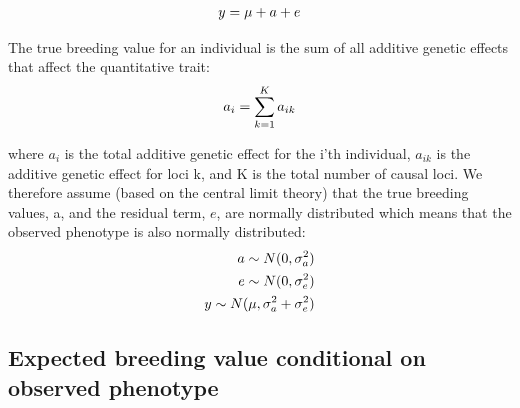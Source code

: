\documentclass[
]{article}
\begin{document}
\begin{align}
            y=\mu+a+e    \notag
\end{align}

The true breeding value for an individual is the sum of all additive genetic effects that affect the quantitative trait:
\begin{align}
        a_{i}=\sum_{k=1}^{K}a_{ik} \notag
\end{align}

where \(a_{i}\) is the total additive genetic effect for the i'th individual, \(a_{ik}\) is the additive genetic effect for loci k, and K is the total number of causal loci. We therefore assume (based on the central limit theory) that the true breeding values, a, and the residual term, \(e\), are normally distributed which means that the observed phenotype is also normally distributed:
\begin{align}
a \sim N(0,\sigma^2_{a}) \notag \\
e \sim N(0,\sigma^2_{e}) \notag \\
y \sim N( \mu,\sigma^2_{a} + \sigma^2_{e}) \notag
\end{align}

\subsection{Expected breeding value conditional on observed phenotype}\label{expected-breeding-value-conditional-on-observed-phenotype}
\end{document}
